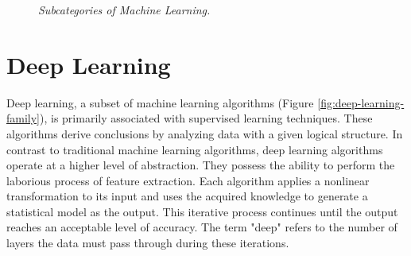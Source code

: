\newpage

\begin{figure}[H]
  \centering
    \caption[Subcategories of Machine Learning.]{\textit{Subcategories of Machine Learning. }}
    {\label{fig:ml_branches}}
\end{figure}


\section{Deep Learning}

Deep learning, a subset of machine learning algorithms (Figure
\ref{fig:deep-learning-family}), is primarily associated with supervised
learning techniques. These algorithms derive conclusions by analyzing data with
a given logical structure. In contrast to traditional machine learning
algorithms, deep learning algorithms operate at a higher level of abstraction.
They possess the ability to perform the laborious process of feature
extraction. Each algorithm applies a nonlinear transformation to its input and
uses the acquired knowledge to generate a statistical model as the output. This
iterative process continues until the output reaches an acceptable level of
accuracy. The term "deep" refers to the number of layers the data must pass
through during these iterations. \\


